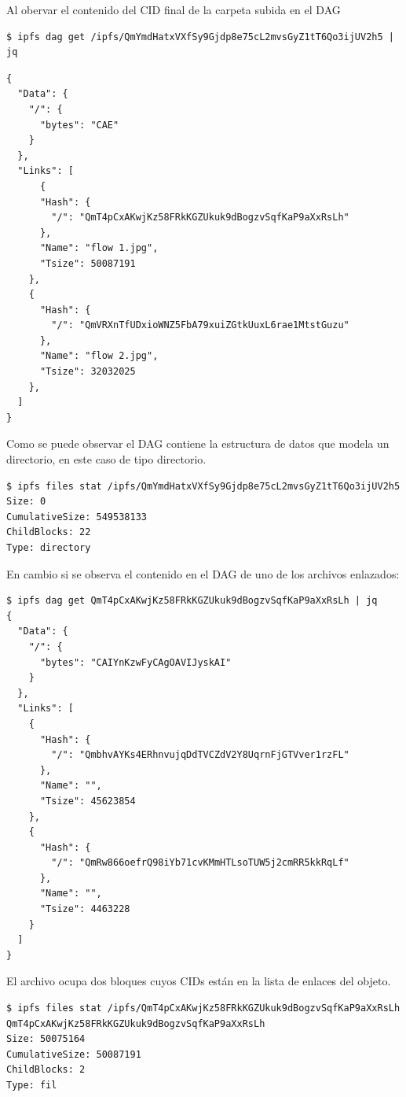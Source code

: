 Al obervar el contenido del CID final de la carpeta subida en el DAG

\begin{verbatim}
$ ipfs dag get /ipfs/QmYmdHatxVXfSy9Gjdp8e75cL2mvsGyZ1tT6Qo3ijUV2h5 | jq
\end{verbatim}
\begin{verbatim}
{
  "Data": {
    "/": {
      "bytes": "CAE"
    }
  },
  "Links": [
      {
      "Hash": {
        "/": "QmT4pCxAKwjKz58FRkKGZUkuk9dBogzvSqfKaP9aXxRsLh"
      },
      "Name": "flow 1.jpg",
      "Tsize": 50087191
    },
    {
      "Hash": {
        "/": "QmVRXnTfUDxioWNZ5FbA79xuiZGtkUuxL6rae1MtstGuzu"
      },
      "Name": "flow 2.jpg",
      "Tsize": 32032025
    },
  ]
}
\end{verbatim}

Como se puede observar el DAG contiene la estructura de datos que modela un directorio, en este caso de tipo directorio.
\begin{verbatim}
$ ipfs files stat /ipfs/QmYmdHatxVXfSy9Gjdp8e75cL2mvsGyZ1tT6Qo3ijUV2h5
Size: 0
CumulativeSize: 549538133
ChildBlocks: 22
Type: directory
\end{verbatim}

En cambio si se observa el contenido en el DAG de uno de los archivos enlazados:
\begin{verbatim}
$ ipfs dag get QmT4pCxAKwjKz58FRkKGZUkuk9dBogzvSqfKaP9aXxRsLh | jq
{
  "Data": {
    "/": {
      "bytes": "CAIYnKzwFyCAgOAVIJyskAI"
    }
  },
  "Links": [
    {
      "Hash": {
        "/": "QmbhvAYKs4ERhnvujqDdTVCZdV2Y8UqrnFjGTVver1rzFL"
      },
      "Name": "",
      "Tsize": 45623854
    },
    {
      "Hash": {
        "/": "QmRw866oefrQ98iYb71cvKMmHTLsoTUW5j2cmRR5kkRqLf"
      },
      "Name": "",
      "Tsize": 4463228
    }
  ]
}
\end{verbatim}
El archivo ocupa dos bloques cuyos CIDs están en la lista de enlaces del objeto.
\begin{verbatim}
$ ipfs files stat /ipfs/QmT4pCxAKwjKz58FRkKGZUkuk9dBogzvSqfKaP9aXxRsLh
QmT4pCxAKwjKz58FRkKGZUkuk9dBogzvSqfKaP9aXxRsLh
Size: 50075164
CumulativeSize: 50087191
ChildBlocks: 2
Type: fil
\end{verbatim}



